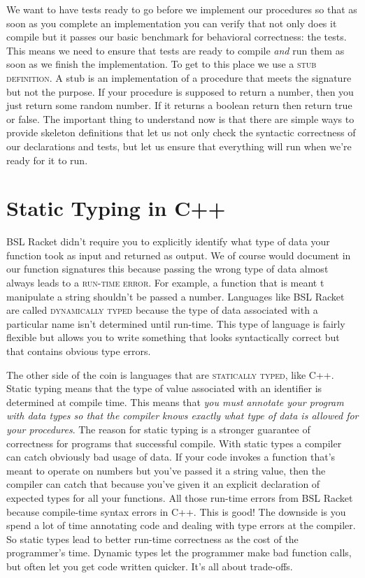 \documentclass[]{tufte-handout}
\begin{document}
We want to have tests ready to go before we implement our procedures so that as soon as you complete an implementation you can verify that not only does it compile but it passes our basic benchmark for behavioral correctness: the tests. This means we need to ensure that tests are ready to compile \textit{and} run them as soon as we finish the implementation. To get to this place we use a \textsc{stub definition}. A stub is an implementation of a procedure that meets the signature but not the purpose. If your procedure is supposed to return a number, then you just return some random number. If it returns a boolean return then return true or false. The important thing to understand now is that there are simple ways to provide skeleton definitions that let us not only check the syntactic correctness of our declarations and tests, but let us ensure that everything will run when we're ready for it to run. 

 
\section{Static Typing in C++}

BSL Racket didn't require you to explicitly identify what type of data your function took as input and returned as output.  We of course would document in our function signatures this because passing the wrong type of data almost always leads to a \textsc{run-time error}. For example, a function that is meant t manipulate a string shouldn't be passed a number. Languages like BSL Racket are called \textsc{dynamically typed} because the type of data associated with a particular name isn't determined until run-time.  This type of language is fairly flexible but allows you to write something that looks syntactically correct but that contains obvious type errors. 
  

The other side of the coin is languages that are \textsc{statically typed}, like C++.  Static typing means that the type of value associated with an identifier is determined at compile time.  This means that \textit{you must annotate  your program with data types so that the compiler knows exactly what type of data is allowed for your procedures}. The reason for static typing is a stronger guarantee of correctness for programs that successful compile.  With static types a compiler can catch obviously bad usage of data. If your code invokes a function that's meant to operate on numbers but you've passed it a string value, then the compiler can catch that because you've given it an explicit declaration of expected types for all your functions. All those run-time errors from BSL Racket because compile-time syntax errors in C++.  This is good! The downside is you spend a lot of time annotating code and dealing with type errors at the compiler. So static types lead to better run-time correctness as the cost of the programmer's time. Dynamic types let the programmer make bad function calls, but often let you get code written quicker. It's all about trade-offs.   
\end{document}
